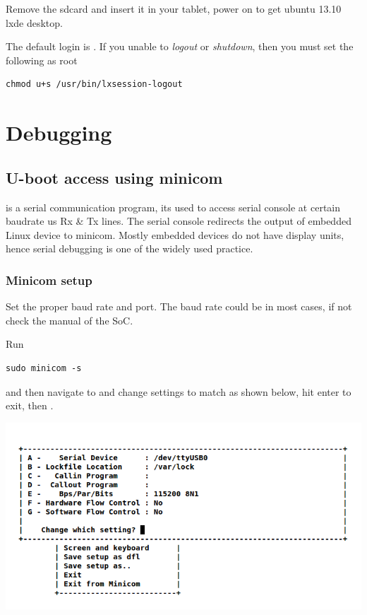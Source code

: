 \documentclass[letterpaper,10pt,english]{sphinxmanual}
\begin{document}
Remove the sdcard and insert it in your tablet, power on to get ubuntu 13.10 lxde desktop.

The default login is . If you unable to \emph{logout} or \emph{shutdown},
then you must set the following as root

\begin{Verbatim}[commandchars=\\\{\}]
chmod u+s /usr/bin/lxsession-logout
\end{Verbatim}


\chapter{Debugging}
\label{embedded-linux:debugging}

\section{U-boot access using minicom}
\label{embedded-linux:u-boot-access-using-minicom}
 is a serial communication program, its used to access serial console
at certain baudrate us Rx \& Tx lines. The serial console redirects the output
of embedded Linux device to minicom. Mostly embedded devices do not have display
units, hence serial debugging is one of the widely used practice.


\subsection{Minicom setup}
\label{embedded-linux:minicom-setup}
Set the proper baud rate and port. The baud rate could be  in most cases,
if not check the manual of the SoC.

Run

\begin{Verbatim}[commandchars=\\\{\}]
sudo minicom -s
\end{Verbatim}

and then navigate to  and change settings to match as shown below,
hit enter to exit, then .

\includegraphics[width=1.000\linewidth]{minicom-setup.png}
\end{document}
